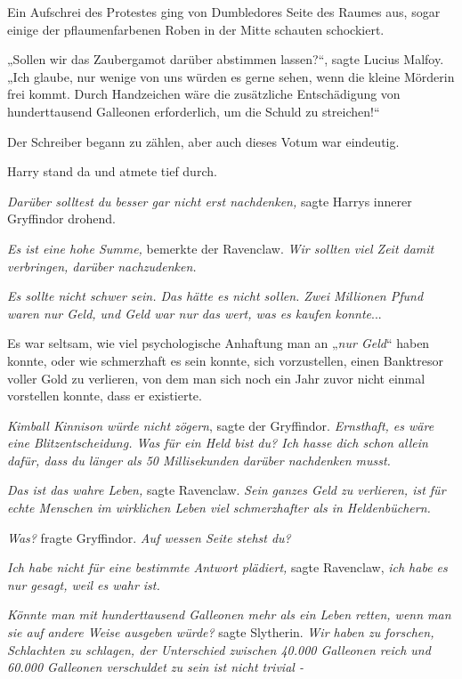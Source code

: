 {Ein Aufschrei des Protestes ging von Dumbledores Seite des Raumes aus, sogar einige der pflaumenfarbenen Roben in der Mitte schauten schockiert.

„Sollen wir das Zaubergamot darüber abstimmen lassen?“, sagte Lucius Malfoy. „Ich glaube, nur wenige von uns würden es gerne sehen, wenn die kleine Mörderin frei kommt. Durch Handzeichen wäre die zusätzliche Entschädigung von hunderttausend Galleonen erforderlich, um die Schuld zu streichen!“

Der Schreiber begann zu zählen, aber auch dieses Votum war eindeutig.

Harry stand da und atmete tief durch.

\emph{Darüber solltest du besser gar nicht erst nachdenken,} sagte Harrys innerer Gryffindor drohend.

\emph{Es ist eine hohe Summe,} bemerkte der Ravenclaw. \emph{Wir sollten viel Zeit damit verbringen, darüber nachzudenken.}

\emph{Es sollte nicht schwer sein. Das hätte es nicht sollen. Zwei Millionen Pfund waren nur Geld, und Geld war nur das wert, was es kaufen konnte}...

Es war seltsam, wie viel psychologische Anhaftung man an „\emph{nur Geld}“ haben konnte, oder wie schmerzhaft es sein konnte, sich vorzustellen, einen Banktresor voller Gold zu verlieren, von dem man sich noch ein Jahr zuvor nicht einmal vorstellen konnte, dass er existierte.

\emph{Kimball Kinnison würde nicht zögern}, sagte der Gryffindor. \emph{Ernsthaft, es wäre eine Blitzentscheidung. Was für ein Held bist du? Ich hasse dich schon allein dafür, dass du länger als 50 Millisekunden darüber nachdenken musst.}

\emph{Das ist das wahre Leben,} sagte Ravenclaw. \emph{Sein ganzes Geld zu verlieren, ist für echte Menschen im wirklichen Leben viel schmerzhafter als in Heldenbüchern.}

\emph{Was?} fragte Gryffindor. \emph{Auf wessen Seite stehst du?}

\emph{Ich habe nicht für eine bestimmte Antwort plädiert,} sagte Ravenclaw, \emph{ich habe es nur gesagt, weil es wahr ist.}

\emph{Könnte man mit hunderttausend Galleonen mehr als ein Leben retten, wenn man sie auf andere Weise ausgeben würde?} sagte Slytherin. \emph{Wir haben zu forschen, Schlachten zu schlagen, der Unterschied zwischen 40.000 Galleonen reich und 60.000 Galleonen verschuldet zu sein ist nicht trivial -}

}
